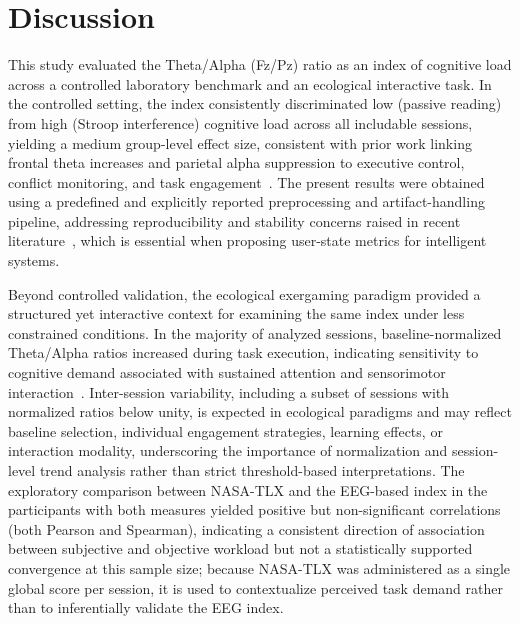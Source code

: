 \documentclass[conference]{IEEEtran}
\begin{document}
\section{Discussion}

This study evaluated the Theta/Alpha (Fz/Pz) ratio as an index of cognitive load across a controlled laboratory benchmark and an ecological interactive task. In the controlled setting, the index consistently discriminated low (passive reading) from high (Stroop interference) cognitive load across all includable sessions, yielding a medium group-level effect size, consistent with prior work linking frontal theta increases and parietal alpha suppression to executive control, conflict monitoring, and task engagement~\cite{c1,c3,c5,c7,c9}. The present results were obtained using a predefined and explicitly reported preprocessing and artifact-handling pipeline, addressing reproducibility and stability concerns raised in recent literature~\cite{c4,c6}, which is essential when proposing user-state metrics for intelligent systems.

Beyond controlled validation, the ecological exergaming paradigm provided a structured yet interactive context for examining the same index under less constrained conditions. In the majority of analyzed sessions, baseline-normalized Theta/Alpha ratios increased during task execution, indicating sensitivity to cognitive demand associated with sustained attention and sensorimotor interaction~\cite{c2,c3}. Inter-session variability, including a subset of sessions with normalized ratios below unity, is expected in ecological paradigms and may reflect baseline selection, individual engagement strategies, learning effects, or interaction modality, underscoring the importance of normalization and session-level trend analysis rather than strict threshold-based interpretations. The exploratory comparison between NASA-TLX and the EEG-based index in the participants with both measures yielded positive but non-significant correlations (both Pearson and Spearman), indicating a consistent direction of association between subjective and objective workload but not a statistically supported convergence at this sample size; because NASA-TLX was administered as a single global score per session, it is used to contextualize perceived task demand rather than to inferentially validate the EEG index.
\end{document}

